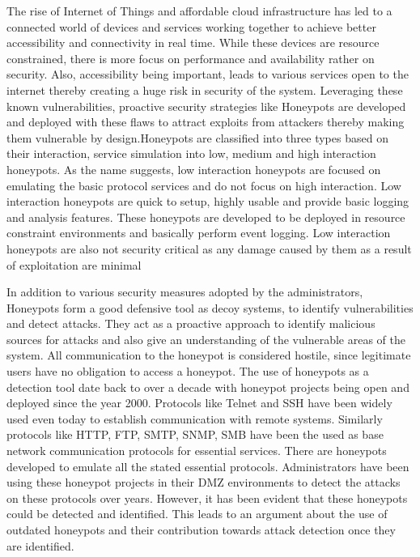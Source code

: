 \documentclass[letterpaper, 10 pt, conference]{ieeeconf}  %
\begin{document}
The rise of Internet of Things and affordable cloud infrastructure has led to a connected world of devices and services working together to achieve better accessibility and connectivity in real time. While these devices are resource constrained, there is more focus on performance and availability rather on security. Also, accessibility being important, leads to various services open to the internet thereby creating a huge risk in security of the system. Leveraging these known vulnerabilities, proactive security strategies like Honeypots are developed and deployed with these flaws to attract exploits from attackers thereby making them vulnerable by design.Honeypots are classified into three types based on their interaction, service simulation into low, medium and high interaction honeypots. As the name suggests, low interaction honeypots are focused on emulating the basic protocol services and do not focus on high interaction. Low interaction honeypots are quick to setup, highly usable and provide basic logging and analysis features. These honeypots are developed  to be deployed in resource constraint environments and basically perform event logging. Low interaction honeypots are also not security critical as any damage caused by them as a result of exploitation are minimal 

In addition to various security measures adopted by the administrators, Honeypots form a good defensive tool as decoy systems, to identify vulnerabilities and detect attacks. They act as a proactive approach to identify malicious sources for attacks and also give an understanding of the vulnerable areas of the system. All communication to the honeypot is considered hostile, since legitimate users have no obligation to access a honeypot. The use of honeypots as a detection tool date back to over a decade with honeypot projects being open and deployed since the year 2000. Protocols like Telnet and SSH have been widely used even today to establish communication with remote systems. Similarly protocols like HTTP, FTP, SMTP, SNMP, SMB have been the used as base network communication protocols for essential services. There are honeypots developed to emulate all the stated essential protocols. Administrators have been using these honeypot projects in their DMZ environments to detect the attacks on these protocols over years. However, it has been evident that these honeypots could be detected and identified. This leads to an argument about the use of outdated honeypots and their contribution towards attack detection once they are identified.
\end{document}
